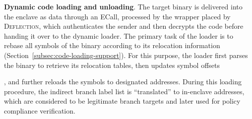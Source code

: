 
\vspace{3pt}\noindent\textbf{Dynamic code loading and unloading}. \label{subsec-loading}
The target binary is delivered into the enclave as data through an ECall, processed by the wrapper placed by \textsc{Deflection}, which authenticates the sender and then decrypts the code before handing it over to the dynamic loader. The primary task of the loader is to rebase all symbols of the binary according to its relocation information (Section~\ref{subsec:code-loading-support}). For this purpose, the loader first parses the binary to retrieve its relocation tables,  then updates symbol offsets, and further reloads the symbols to designated addresses. During this loading procedure, the indirect branch label list is ``translated'' to in-enclave addresses, which are considered to be legitimate branch targets and later used for policy compliance verification. 


